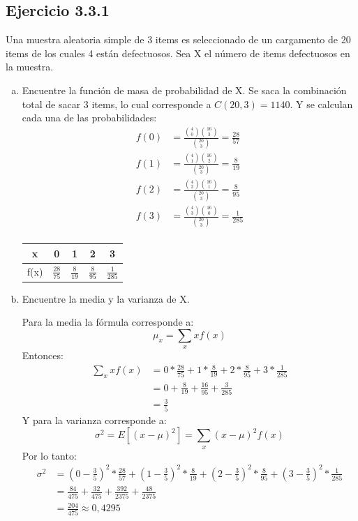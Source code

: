 \documentclass{article}\usepackage[]{graphicx}\usepackage[]{color}
\begin{document}
\subsection{Ejercicio 3.3.1}
Una muestra aleatoria simple de 3 items es seleccionado de un cargamento de 20 items de los cuales 4 están defectuosos. Sea X el número de items defectuosos en la muestra.
\begin{enumerate}[(a)]
    \item Encuentre la función de masa de probabilidad de X.
Se saca la combinación total de sacar 3 items, lo cual corresponde a $C(20,3) = 1140$. Y se calculan cada una de las probabilidades:
\begin{align*}
f(0) &= \frac{{4 \choose 0} {16 \choose 3}}{{20 \choose 3}} = \frac{28}{57}\\
f(1) &= \frac{{4 \choose 1} {16 \choose 2}}{{20 \choose 3}} = \frac{8}{19}\\
f(2) &= \frac{{4 \choose 2} {16 \choose 1}}{{20 \choose 3}} = \frac{8}{95}\\
f(3) &= \frac{{4 \choose 3} {16 \choose 0}}{{20 \choose 3}} = \frac{1}{285}\\
\end{align*}
\begin{table}[H]
\centering
\def\arraystretch{1.5}
\begin{tabular}{c|c c c c }
x    & 0     & 1    & 2    & 3     \\ \hline
f(x) & $\frac{28}{75}$ & $\frac{8}{19}$ & $\frac{8}{95}$ & $\frac{1}{285}$
\end{tabular}
\end{table}

    \item Encuentre la media y la varianza de X.
    
Para la media la fórmula corresponde a:
\[\mu_{x} = \sum_{x}xf(x)\]
Entonces:
\begin{align*}
    \sum_{x}xf(x) &= 0*\frac{28}{75}+1*\frac{8}{19}+2*\frac{8}{95}+3*\frac{1}{285}\\
    &= 0 + \frac{8}{19} + \frac{16}{95} + \frac{3}{285}\\
    &= \frac{3}{5}
\end{align*}
Y para la varianza corresponde a:
\[\sigma^{2} = E[(x-\mu)^{2}] = \sum_{x}(x-\mu)^{2}f(x)\]
Por lo tanto:
\begin{align*}
    \sigma^{2} &= \left(0-\frac{3}{5}\right)^{2}*\frac{28}{57}+\left(1-\frac{3}{5}\right)^{2}*\frac{8}{19}+\left(2-\frac{3}{5}\right)^{2}*\frac{8}{95}+\left(3-\frac{3}{5}\right)^{2}*\frac{1}{285}\\
    &= \frac{84}{475}+\frac{32}{475}+\frac{392}{2375}+\frac{48}{2375}\\
    &= \frac{204}{475} \approx 0,4295
\end{align*}
\end{enumerate}
\end{document}
